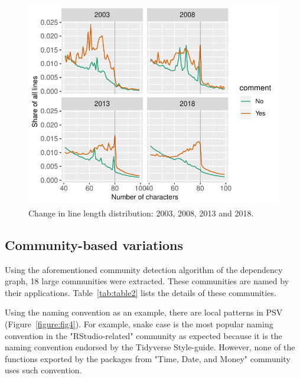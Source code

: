 \begin{figure}[htbp]
  \centering
  \includegraphics{fig3}
  \caption{Change in line length distribution: 2003, 2008, 2013 and 2018.}
  \label{figure:fig3}
\end{figure}


\subsection{Community-based variations}

Using the aforementioned community detection algorithm of the dependency graph, 18 large communities were extracted. These communities are named by their applications. Table~\ref{tab:table2} lists the details of these communities.

Using the naming convention as an example, there are local patterns in PSV (Figure~\ref{figure:fig4}). For example, snake case is the most popular naming convention in the "RStudio-related" community as expected because it is the naming convention endorsed by the Tidyverse Style-guide. However, none of the functions exported by the packages from "Time, Date, and Money" community uses such convention.

